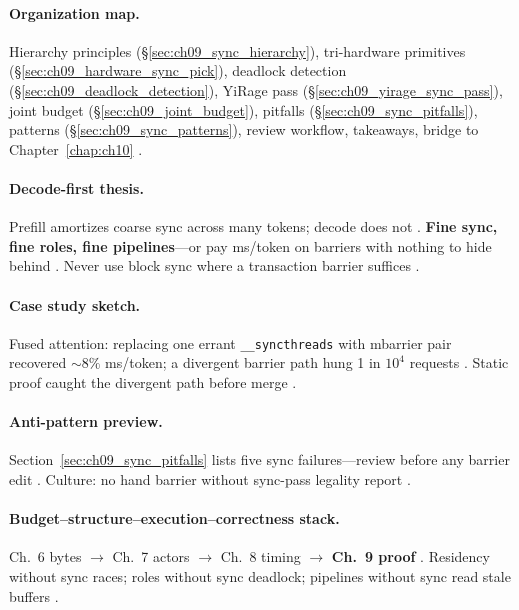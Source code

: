 \paragraph{Organization map.}
Hierarchy principles (\S\ref{sec:ch09_sync_hierarchy}), tri-hardware primitives (\S\ref{sec:ch09_hardware_sync_pick}), deadlock detection (\S\ref{sec:ch09_deadlock_detection}), YiRage pass (\S\ref{sec:ch09_yirage_sync_pass}), joint budget (\S\ref{sec:ch09_joint_budget}), pitfalls (\S\ref{sec:ch09_sync_pitfalls}), patterns (\S\ref{sec:ch09_sync_patterns}), review workflow, takeaways, bridge to Chapter~\ref{chap:ch10} \citep{dao2022flashattention,semianalysis2024tma}.

\paragraph{Decode-first thesis.}
Prefill amortizes coarse sync across many tokens; decode does not \citep{kwon2023vllm,shah2024flashattention3,patel2025llminference}.
\textbf{Fine sync, fine roles, fine pipelines}---or pay ms/token on barriers with nothing to hide behind \citep{taxbreak2026,memoryfloor2026}.
Never use block sync where a transaction barrier suffices \citep{semianalysis2024tma,yirage2026}.

\paragraph{Case study sketch.}
Fused attention: replacing one errant \texttt{\_\_syncthreads} with mbarrier pair recovered ${\sim}8\%$ ms/token; a divergent barrier path hung 1 in $10^4$ requests \citep{shah2024flashattention3,patel2025llminference,taxbreak2026}.
Static proof caught the divergent path before merge \citep{yirage2026,wu2024mirage,chen2020compilerbasedhardw}.

\paragraph{Anti-pattern preview.}
Section~\ref{sec:ch09_sync_pitfalls} lists five sync failures---review before any barrier edit \citep{yirage2026,shah2024flashattention3}.
Culture: no hand barrier without sync-pass legality report \citep{chen2020compilerbasedhardw,taxbreak2026}.

\paragraph{Budget--structure--execution--correctness stack.}
Ch.~6 bytes $\rightarrow$ Ch.~7 actors $\rightarrow$ Ch.~8 timing $\rightarrow$ \textbf{Ch.~9 proof} \citep{dao2022flashattention,shah2024flashattention3,semianalysis2024tma,yirage2026}.
Residency without sync races; roles without sync deadlock; pipelines without sync read stale buffers \citep{memoryfloor2026,amd2024aie,mpk2025,wu2024mirage}.

